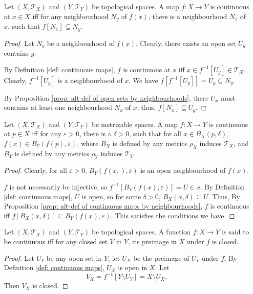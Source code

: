 \begin{theorem}
	\label{prop: alt-def of continuous maps by neighbourhoods}
	Let $(X, \mathcal T_X)$ and $(Y, \mathcal T_Y)$ be topological spaces. A map $f: X \to Y$ is continuous at $x \in X$ iff for any neighbourhood $N_y$ of $f(x)$, there is a neighbourhood $N_x$ of $x$, such that $f[N_x] \subseteq N_y$.
	
	\begin{proof}
		Let $N_y$ be a neighbourhood of $f(x)$. Clearly, there exists an open set $U_y$ contains $y$.
	
		By Definition \ref{def: continuous maps}, $f$ is continuous at $x$ iff $x \in f^{-1}[U_y] \in \mathcal T_X$. Clearly, $f^{-1}[U_y]$ is a neighbourhood of $x$. We have $f[f^{-1}[U_y]] = U_y \subseteq N_y$.
		
		By Proposition \ref{prop: alt-def of open sets by neighbourhoods}, there $U_x$ must contains at least one neighbourhood $N_x$ of $x$, thus, $f[N_x] \subseteq U_y$.
	\end{proof}
\end{theorem}


\begin{proposition}
	Let $(X, \mathcal T_X)$ and $(Y, \mathcal T_{Y})$ be metrizable spaces. A map $f: X \to Y$ is continuous at $p \in X$ iff for any $\varepsilon > 0$, there is a $\delta > 0$, such that for all $x \in B_X(p, \delta)$, $f(x) \in B_Y(f(p), \varepsilon)$, where $B_X$ is defined by any metrics $\rho_X$ induces $\mathcal T_X$, and $B_Y$ is defined by any metrics $\rho_Y$ induces $\mathcal T_Y$.
	
	\begin{proof}
		Clearly, for all $\varepsilon > 0$, $B_Y(f(x,), \varepsilon)$ is an open neighbourhood of $f(x)$.
		
		$f$ is not necessarily be injective, so $f^{-1}[B_Y(f(x), \varepsilon)] = U \in x$. By Definition \ref{def: continuous maps}, $U$ is open, so for some $\delta > 0$, $B_X(x, \delta) \subseteq U$. Thus, By Proposition \ref{prop: alt-def of continuous maps by neighbourhoods}, $f$ is continuous iff $f[B_X(x, \delta)] \subseteq B_Y(f(x), \varepsilon)$. This satisfies the conditions we have.
	\end{proof}
\end{proposition}


\begin{proposition}
	Let $(X, \mathcal T_X)$ and $(Y, \mathcal T_Y)$ be topological spaces. A function $f: X \to Y$ is said to be continuous iff for any closed set $V$ in $Y$, its preimage in $X$ under $f$ is closed.
	
	\begin{proof}
		Let $U_Y$ be any open set in $Y$, let $U_X$ be the preimage of $U_Y$ under $f$. By Definition \ref{def: continuous maps}, $U_X$ is open in $X$. Let
		$$
		V_X = f^{-1}[Y \setminus U_Y] = X \setminus U_X,
		$$
		Then $V_X$ is closed.
	\end{proof}
\end{proposition}


